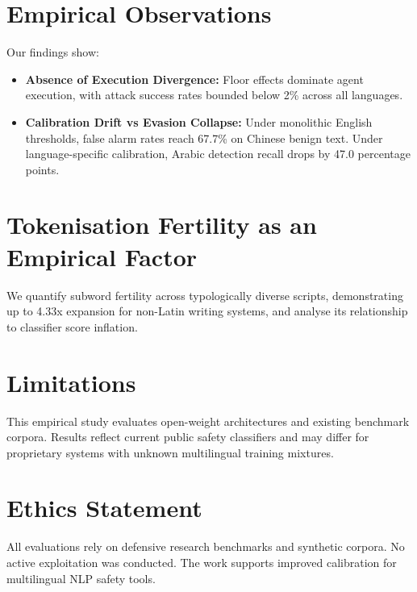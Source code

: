 \documentclass[11pt]{article}
\begin{document}
\section{Empirical Observations}
Our findings show:
\begin{itemize}
    \item \textbf{Absence of Execution Divergence:} Floor effects dominate agent execution, with attack success rates bounded below 2\% across all languages.
    \item \textbf{Calibration Drift vs Evasion Collapse:} Under monolithic English thresholds, false alarm rates reach 67.7\% on Chinese benign text. Under language-specific calibration, Arabic detection recall drops by 47.0 percentage points.
\end{itemize}

\section{Tokenisation Fertility as an Empirical Factor}
We quantify subword fertility across typologically diverse scripts, demonstrating up to 4.33x expansion for non-Latin writing systems, and analyse its relationship to classifier score inflation.

\section{Limitations}
This empirical study evaluates open-weight architectures and existing benchmark corpora. Results reflect current public safety classifiers and may differ for proprietary systems with unknown multilingual training mixtures.

\section{Ethics Statement}
All evaluations rely on defensive research benchmarks and synthetic corpora. No active exploitation was conducted. The work supports improved calibration for multilingual NLP safety tools.


\end{document}
